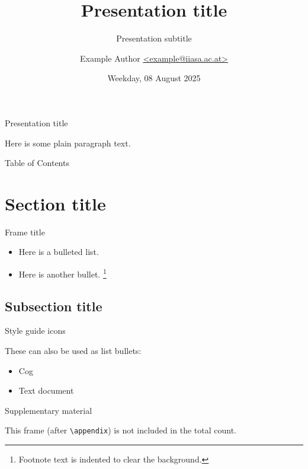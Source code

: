 \title{Presentation title}
\subtitle{Presentation subtitle}
\author{Example Author
  \href{mailto:example@iiasa.ac.at}%
  {\ttfamily <example@iiasa.ac.at>}}
\date{Weekday, 08 August 2025}



\maketitle

\begin{frame}{Presentation title}

	Here is some plain paragraph text.

\end{frame}

\begin{frame}{Table of Contents}

	\tableofcontents

\end{frame}

\section{Section title}

\begin{frame}{Frame title}

	\begin{itemize}
		\item Here is a bulleted list.
		\item Here is another bullet.%
		      \footnote{Footnote text is indented to clear the background.}
	\end{itemize}

\end{frame}

\subsection{Subsection title}

\begin{frame}{Style guide icons}


	These can also be used as list bullets:

	\begin{itemize}
		\item [\iiasaicon{cog}] Cog
		\item [\iiasaicon{doc-text}] Text document
	\end{itemize}

\end{frame}

\makefinalslide

\appendix

\begin{frame}{Supplementary material}

	This frame (after \texttt{\textbackslash{}appendix}) is not included in the total count.

\end{frame}


